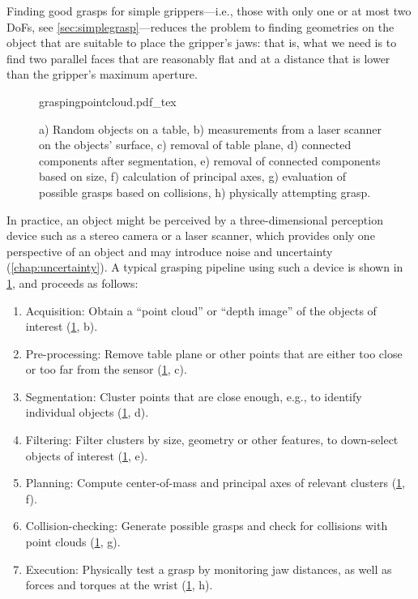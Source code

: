 Finding good grasps for simple grippers---i.e., those with only one or at most two DoFs, see \cref{sec:simplegrasp}---reduces the problem to finding geometries on the object that are suitable to place the gripper's jaws: that is, what we need is to find two parallel faces that are reasonably flat and at a distance that is lower than the gripper's maximum aperture.
\begin{figure}
    \def\svgwidth{\textwidth}
    {graspingpointcloud.pdf_tex}
    \caption{a) Random objects on a table, b) measurements from a laser scanner on the objects' surface, c) removal of table plane, d) connected components after segmentation, e) removal of connected components based on size, f) calculation of principal axes, g) evaluation of possible grasps based on collisions, h) physically attempting grasp.\label{fig:graspalgorithm}}
\end{figure}
In practice, an object might be perceived by a three-dimensional perception device such as a stereo camera or a laser scanner, which provides only one perspective of an object and may introduce noise and uncertainty (\cref{chap:uncertainty}). A typical grasping pipeline using such a device is shown in \cref{fig:graspalgorithm}, and proceeds as follows:
\begin{enumerate}
\item Acquisition: Obtain a ``point cloud'' or ``depth image'' of the objects of interest (\cref{fig:graspalgorithm}, b).
\item Pre-processing: Remove table plane or other points that are either too close or too far from the sensor (\cref{fig:graspalgorithm}, c).
\item Segmentation: Cluster points that are close enough, e.g., to identify individual objects (\cref{fig:graspalgorithm}, d).
\item Filtering: Filter clusters by size, geometry or other features, to down-select objects of interest (\cref{fig:graspalgorithm}, e).
\item Planning: Compute center-of-mass and principal axes of relevant clusters (\cref{fig:graspalgorithm}, f).
\item Collision-checking: Generate possible grasps and check for collisions with point clouds (\cref{fig:graspalgorithm}, g).
\item Execution: Physically test a grasp by monitoring jaw distances, as well as forces and torques at the wrist (\cref{fig:graspalgorithm}, h).
\end{enumerate}


